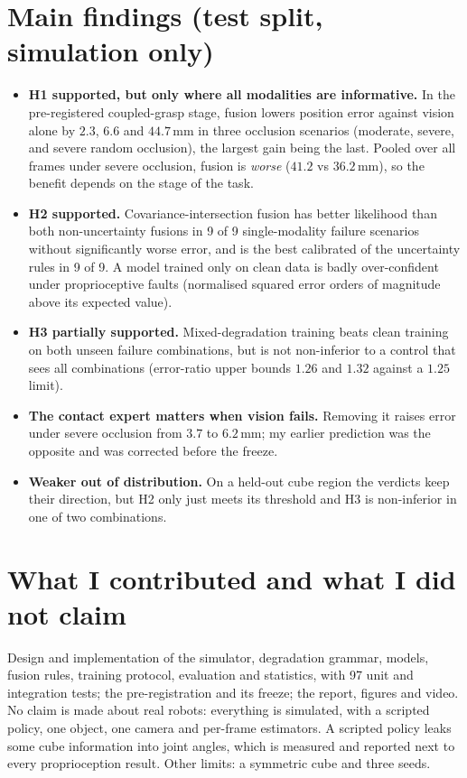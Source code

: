 \documentclass[10pt,a4paper]{article}
\begin{document}
\section*{Main findings (test split, simulation only)}
\begin{itemize}
\item \textbf{H1 supported, but only where all modalities are informative.} In the pre-registered coupled-grasp stage, fusion lowers position error against vision alone by $2.3$, $6.6$ and $44.7$\,mm in three occlusion scenarios (moderate, severe, and severe random occlusion), the largest gain being the last. Pooled over all frames under severe occlusion, fusion is \emph{worse} ($41.2$ vs $36.2$\,mm), so the benefit depends on the stage of the task.
\item \textbf{H2 supported.} Covariance-intersection fusion has better likelihood than both non-uncertainty fusions in 9 of 9 single-modality failure scenarios without significantly worse error, and is the best calibrated of the uncertainty rules in 9 of 9. A model trained only on clean data is badly over-confident under proprioceptive faults (normalised squared error orders of magnitude above its expected value).
\item \textbf{H3 partially supported.} Mixed-degradation training beats clean training on both unseen failure combinations, but is not non-inferior to a control that sees all combinations (error-ratio upper bounds $1.26$ and $1.32$ against a $1.25$ limit).
\item \textbf{The contact expert matters when vision fails.} Removing it raises error under severe occlusion from $3.7$ to $6.2$\,mm; my earlier prediction was the opposite and was corrected before the freeze.
\item \textbf{Weaker out of distribution.} On a held-out cube region the verdicts keep their direction, but H2 only just meets its threshold and H3 is non-inferior in one of two combinations.
\end{itemize}

\section*{What I contributed and what I did not claim}
Design and implementation of the simulator, degradation grammar, models, fusion rules, training protocol, evaluation and statistics, with 97 unit and integration tests; the pre-registration and its freeze; the report, figures and video.
No claim is made about real robots: everything is simulated, with a scripted policy, one object, one camera and per-frame estimators.
A scripted policy leaks some cube information into joint angles, which is measured and reported next to every proprioception result.
Other limits: a symmetric cube and three seeds.
\end{document}
